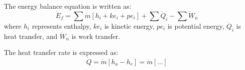 The energy balance equation is written as:  
\[
\dot{E}_f = \sum \dot{m} \left[ h_i + ke_i + pe_i \right] + \sum \dot{Q}_i - \sum \dot{W}_n
\]  
where \( h_i \) represents enthalpy, \( ke_i \) is kinetic energy, \( pe_i \) is potential energy, \( \dot{Q}_i \) is heat transfer, and \( \dot{W}_n \) is work transfer.  

The heat transfer rate is expressed as:  
\[
\dot{Q} = \dot{m} \left[ h_a - h_e \right] = \dot{m} \left[ \ldots \right]
\]